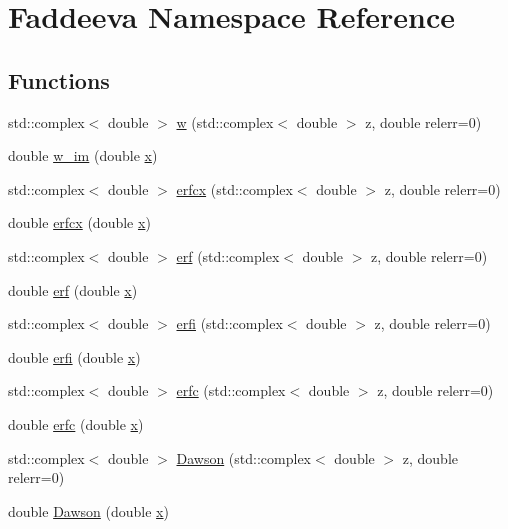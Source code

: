 \hypertarget{namespaceFaddeeva}{}\section{Faddeeva Namespace Reference}
\label{namespaceFaddeeva}
\subsection*{Functions}
\begin{DoxyCompactItemize}
\item 
std\+::complex$<$ double $>$ \hyperlink{namespaceFaddeeva_a0e1f1f0d2dce77bfa0db22a63f8a42ff}{w} (std\+::complex$<$ double $>$ z, double relerr=0)
\item 
double \hyperlink{namespaceFaddeeva_afb5630bc7c403b2109943f22913214b8}{w\+\_\+im} (double \hyperlink{vecnorm1_8cc_ac73eed9e41ec09d58f112f06c2d6cb63}{x})
\item 
std\+::complex$<$ double $>$ \hyperlink{namespaceFaddeeva_a7e83cb6f67459df6c74aa2220f6fdb9b}{erfcx} (std\+::complex$<$ double $>$ z, double relerr=0)
\item 
double \hyperlink{namespaceFaddeeva_af5360b5139cc6dc788209eb05d1baab8}{erfcx} (double \hyperlink{vecnorm1_8cc_ac73eed9e41ec09d58f112f06c2d6cb63}{x})
\item 
std\+::complex$<$ double $>$ \hyperlink{namespaceFaddeeva_ae237ecbb8393d6c86d3b515d6677ffe8}{erf} (std\+::complex$<$ double $>$ z, double relerr=0)
\item 
double \hyperlink{namespaceFaddeeva_ad8070b592bd46072441f110eaf9db93c}{erf} (double \hyperlink{vecnorm1_8cc_ac73eed9e41ec09d58f112f06c2d6cb63}{x})
\item 
std\+::complex$<$ double $>$ \hyperlink{namespaceFaddeeva_ae01c2714310e91a2485c5861e58e81e5}{erfi} (std\+::complex$<$ double $>$ z, double relerr=0)
\item 
double \hyperlink{namespaceFaddeeva_a4bf0feb821d8b14d0a7ee85e7fc35f3b}{erfi} (double \hyperlink{vecnorm1_8cc_ac73eed9e41ec09d58f112f06c2d6cb63}{x})
\item 
std\+::complex$<$ double $>$ \hyperlink{namespaceFaddeeva_a415b553e96fc456a7e0354470d60ecdf}{erfc} (std\+::complex$<$ double $>$ z, double relerr=0)
\item 
double \hyperlink{namespaceFaddeeva_aaf799931d13a75c6975d0b197e47f99f}{erfc} (double \hyperlink{vecnorm1_8cc_ac73eed9e41ec09d58f112f06c2d6cb63}{x})
\item 
std\+::complex$<$ double $>$ \hyperlink{namespaceFaddeeva_ae5a704b7d95301280c9a834d3e0d59ad}{Dawson} (std\+::complex$<$ double $>$ z, double relerr=0)
\item 
double \hyperlink{namespaceFaddeeva_a42faa33ef70a7509117dddb5a1c00e33}{Dawson} (double \hyperlink{vecnorm1_8cc_ac73eed9e41ec09d58f112f06c2d6cb63}{x})
\end{DoxyCompactItemize}


